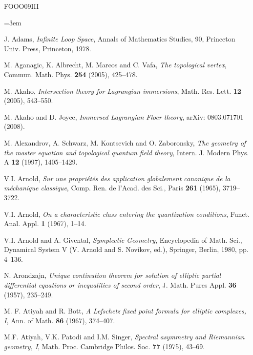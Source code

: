\begingroup
\renewcommand{\bibname}{参考文献}
\begin{thebibliography}{FOOO09III}
\footnotesize
\linespread{0.98}\selectfont
\setlength{\itemsep}{0.12\baselineskip plus 0.04\baselineskip minus 0.04\baselineskip}
\setlength{\parsep}{0pt}
\setlength{\parskip}{0pt}
\emergencystretch=3em

 J. Adams, \emph{Infinite Loop Space}, Annals of Mathematics Studies, 90, Princeton Univ. Press, Princeton, 1978.

 M. Aganagic, K. Albrecht, M. Marcos and C. Vafa, \emph{The topological vertex}, Commun. Math. Phys. \textbf{254} (2005), 425–478.

 M. Akaho, \emph{Intersection theory for Lagrangian immersions}, Math. Res. Lett. \textbf{12} (2005), 543–550.

 M. Akaho and D. Joyce, \emph{Immersed Lagrangian Floer theory}, arXiv: 0803.071701 (2008).

 M. Alexandrov, A. Schwarz, M. Kontsevich and O. Zaboronsky, \emph{The geometry of the master equation and topological quantum field theory}, Intern. J. Modern Phys. A \textbf{12} (1997), 1405–1429.

 V.I. Arnold, \emph{Sur une propriétés des application globalement canonique de la méchanique classique}, Comp. Ren. de l'Acad. des Sci., Paris \textbf{261} (1965), 3719–3722.

 V.I. Arnold, \emph{On a characteristic class entering the quantization conditions}, Funct. Anal. Appl. \textbf{1} (1967), 1–14.

 V.I. Arnold and A. Givental, \emph{Symplectic Geometry}, Encyclopedia of Math. Sci., Dynamical System V (V. Arnold and S. Novikov, ed.), Springer, Berlin, 1980, pp. 4–136.

 N. Arondzajn, \emph{Unique continution theorem for solution of elliptic partial differential equations or inequalities of second order}, J. Math. Pures Appl. \textbf{36} (1957), 235–249.

 M. F. Atiyah and R. Bott, \emph{A Lefschetz fixed point formula for elliptic complexes, I}, Ann. of Math. \textbf{86} (1967), 374–407.

 M.F. Atiyah, V.K. Patodi and I.M. Singer, \emph{Spectral asymmetry and Riemannian geometry, I}, Math. Proc. Cambridge Philos. Soc. \textbf{77} (1975), 43–69.


\end{thebibliography}
